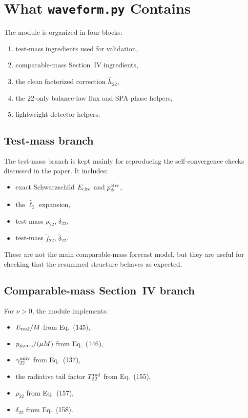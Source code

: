 \documentclass[11pt]{article}
\begin{document}
\section{What \texttt{waveform.py} Contains}

The module is organized in four blocks:
\begin{enumerate}
  \item test-mass ingredients used for validation,
  \item comparable-mass Section~IV ingredients,
  \item the clean factorized correction \(\hat h_{22}\),
  \item the 22-only balance-law flux and SPA phase helpers,
  \item lightweight detector helpers.
\end{enumerate}

\subsection{Test-mass branch}

The test-mass branch is kept mainly for reproducing the self-convergence
checks discussed in the paper. It includes:
\begin{itemize}
  \item exact Schwarzschild \(E_{\rm circ}\) and \(p_\phi^{\rm circ}\),
  \item the \(\hat \ell_2\) expansion,
  \item test-mass \(\rho_{22}\), \(\delta_{22}\),
  \item test-mass \(\tilde f_{22}\), \(\tilde \delta_{22}\).
\end{itemize}

These are not the main comparable-mass forecast model, but they are useful for
checking that the resummed structure behaves as expected.

\subsection{Comparable-mass Section~IV branch}

For \(\nu > 0\), the module implements:
\begin{itemize}
  \item \(E_{\rm real}/M\) from Eq.~(145),
  \item \(p_{\phi,{\rm circ}}/(\mu M)\) from Eq.~(146),
  \item \(\gamma_{22}^{\rm univ}\) from Eq.~(137),
  \item the radiative tail factor \(T_{22}^{\rm rad}\) from Eq.~(155),
  \item \(\rho_{22}\) from Eq.~(157),
  \item \(\delta_{22}\) from Eq.~(158).
\end{itemize}
\end{document}
